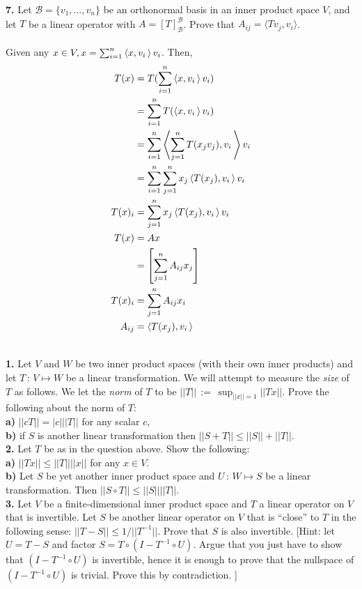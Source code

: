 \documentclass[11pt]{amsart}
\theoremstyle{definition}  %
\begin{document}
\vskip 0.1cm
\noindent
{\bf 7.}  Let $\mathcal{B} = \{v_1, \ldots, v_n \}$ be an orthonormal basis in an inner product space $V$, and let $T$ be a linear operator with $A = [T]_{\mathcal{B}}^{\mathcal{B}}$. 
Prove that $A_{ij} = \langle Tv_j, v_i \rangle$. \\
\\
Given any $x \in V, x = \sum_{i=1}^n \left\langle x,v_i \,\right\rangle v_i$.  Then, 
\begin{align*}
	T(x) &= T(\sum_{i=1}^n \left\langle x,v_i \,\right\rangle v_i) \\
	&= \sum_{i=1}^n T(\left\langle x,v_i \,\right\rangle v_i) \\
	&= \sum_{i=1}^n \left\langle \sum_{j=1}^n T(x_jv_j),v_i \,\right\rangle v_i \\
	&= \sum_{i=1}^n \sum_{j=1}^n x_j \left\langle T(x_j),v_i \,\right\rangle v_i\\
	T(x)_i &= \sum_{j=1}^n x_j \left\langle T(x_j),v_i \,\right\rangle v_i\\
	T(x) &= Ax\\
	&= \left [\sum_{j=1}^n A_{ij}x_j \right ] \\
	T(x)_i &= \sum_{j=1}^n A_{ij}x_i  \\
	A_{ij} &= \left\langle T(x_j),v_i \,\right\rangle
\end{align*}






\vfill
\eject
{}\\
{\bf 1.} Let $V$ and $W$ be two inner product spaces (with their own inner products) and let $ T \, : \, V \mapsto W$ be a linear transformation. We will attempt to measure the {\it size}
of $T$ as follows. We let  the {\it norm} of $T$ to be $||T|| \, := \, \sup_{||x|| = 1} ||Tx||$. Prove the following about the norm of $T$:\\
{\bf a)} $||cT || = |c| ||T||$ for any scalar $c$,\\
{\bf b)} if $S$ is another linear transformation then $||S + T || \leq ||S|| + ||T||$.\\


\vskip 0.1cm
\noindent 
{\bf 2.}  Let $T$ be as in the question above. Show the following: \\
{\bf a)} $||Tx|| \leq ||T|| ||x||$ for any $x \in V$.\\
{\bf b)} Let $S$ be yet another inner product space and $U \, : \, W \mapsto S$ be a linear transformation. Then $|| S \circ T || \leq ||S|| ||T||$. \\

\vskip 0.1cm
\noindent 
{\bf 3.}  Let $V$ be a finite-dimensional inner product space and $T$ a linear operator on $V$ that is invertible. Let $S$ be another linear operator on $V$ that is ``close'' to $T$ 
in the following sense: $||T - S || \leq 1/||T^{-1}||$. Prove that $S$ is also invertible. [Hint: let $U = T-S$ and factor $S = T \circ (I - T^{-1} \circ U)$. Argue that you just have to show
that $(I - T^{-1} \circ U)$ is invertible, hence it is enough to prove that the nullspace of $(I-T^{-1} \circ U)$ is trivial.  Prove this by contradiction. ]\\
\end{document}
